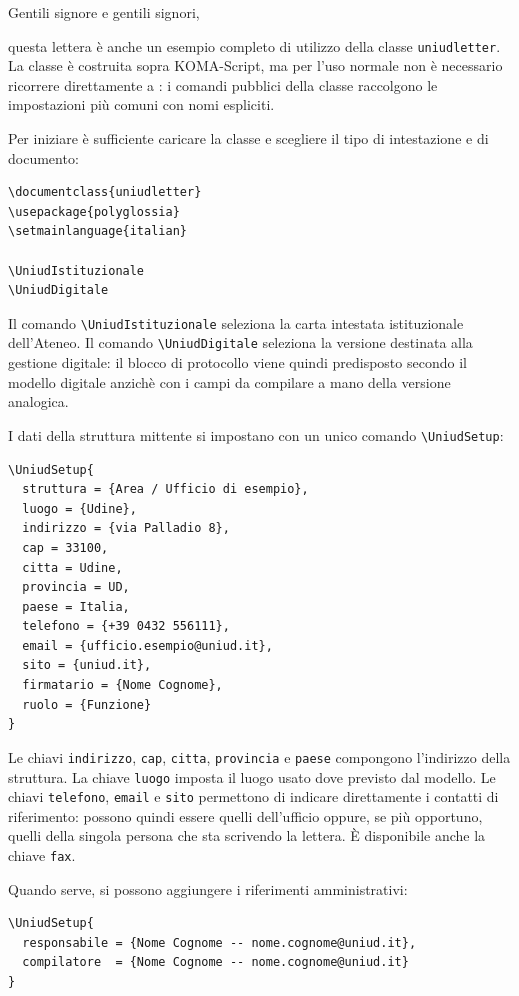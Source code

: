 \documentclass{uniudletter}
\begin{document}
\begin{letter}{}
\opening{Gentili signore e gentili signori,}

questa lettera è anche un esempio completo di utilizzo della classe
\texttt{uniudletter}. La classe è costruita sopra KOMA-Script, ma per l'uso
normale non è necessario ricorrere direttamente a \texttt{\string\setkomavar}:
i comandi pubblici della classe raccolgono le impostazioni più comuni con nomi
espliciti.

Per iniziare è sufficiente caricare la classe e scegliere il tipo di
intestazione e di documento:

\begin{lstlisting}
\documentclass{uniudletter}
\usepackage{polyglossia}
\setmainlanguage{italian}

\UniudIstituzionale
\UniudDigitale
\end{lstlisting}

Il comando \lstinline|\UniudIstituzionale| seleziona la carta intestata
istituzionale dell'Ateneo. Il comando \lstinline|\UniudDigitale| seleziona la
versione destinata alla gestione digitale: il blocco di protocollo viene quindi
predisposto secondo il modello digitale anzichè con i campi da compilare a
mano della versione analogica.

I dati della struttura mittente si impostano con un unico comando
\lstinline|\UniudSetup|:

\begin{lstlisting}
\UniudSetup{
  struttura = {Area / Ufficio di esempio},
  luogo = {Udine},
  indirizzo = {via Palladio 8},
  cap = 33100,
  citta = Udine,
  provincia = UD,
  paese = Italia,
  telefono = {+39 0432 556111},
  email = {ufficio.esempio@uniud.it},
  sito = {uniud.it},
  firmatario = {Nome Cognome},
  ruolo = {Funzione}
}
\end{lstlisting}

Le chiavi \texttt{indirizzo}, \texttt{cap}, \texttt{citta},
\texttt{provincia} e \texttt{paese} compongono l'indirizzo della struttura.
La chiave \texttt{luogo} imposta il luogo usato dove previsto dal modello.
Le chiavi \texttt{telefono}, \texttt{email} e \texttt{sito} permettono di
indicare direttamente i contatti di riferimento: possono quindi essere quelli
dell'ufficio oppure, se più opportuno, quelli della singola persona che sta
scrivendo la lettera. È disponibile anche la chiave \texttt{fax}.

Quando serve, si possono aggiungere i riferimenti amministrativi:

\begin{lstlisting}
\UniudSetup{
  responsabile = {Nome Cognome -- nome.cognome@uniud.it},
  compilatore  = {Nome Cognome -- nome.cognome@uniud.it}
}
\end{lstlisting}


\end{letter}
\end{document}
